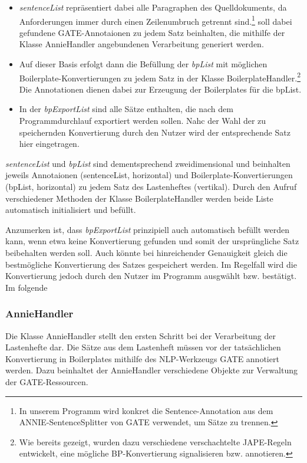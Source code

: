 \documentclass[12pt]{report}
\begin{document}
\begin{itemize}
\item \textit{sentenceList} repräsentiert dabei alle Paragraphen des Quelldokuments, da Anforderungen immer durch einen Zeilenumbruch getrennt sind.\footnote{In unserem Programm wird konkret die Sentence-Annotation aus dem ANNIE-SentenceSplitter von GATE verwendet, um Sätze zu trennen.} soll dabei gefundene GATE-Annotaionen zu jedem Satz beinhalten, die mithilfe der Klasse AnnieHandler angebundenen Verarbeitung generiert werden.
\item Auf dieser Basis erfolgt dann die Befüllung der \textit{bpList} mit möglichen Boilerplate-Konvertierungen zu jedem Satz in der Klasse BoilerplateHandler.\footnote{Wie bereits gezeigt, wurden dazu verschiedene verschachtelte JAPE-Regeln entwickelt, eine mögliche BP-Konvertierung signalisieren bzw. annotieren.} Die Annotationen dienen dabei zur Erzeugung der Boilerplates für die bpList.
\item In der \textit{bpExportList} sind alle Sätze enthalten, die nach dem Programmdurchlauf exportiert werden sollen. Nahc der Wahl der zu speichernden Konvertierung durch den Nutzer wird der entsprechende Satz hier eingetragen.
\end{itemize}

\textit{sentenceList} und \textit{bpList} sind dementsprechend zweidimensional und beinhalten jeweils Annotaionen (sentenceList, horizontal) und Boilerplate-Konvertierungen (bpList, horizontal) zu jedem Satz des Lastenheftes (vertikal). 
Durch den Aufruf verschiedener Methoden der Klasse BoilerplateHandler werden beide Liste automatisch initialisiert und befüllt.

Anzumerken ist, dass \textit{bpExportList} prinzipiell auch automatisch befüllt werden kann, wenn etwa keine Konvertierung gefunden und somit der ursprüngliche Satz beibehalten werden soll. Auch könnte bei hinreichender Genauigkeit gleich die bestmögliche Konvertierung des Satzes gespeichert werden. Im Regelfall wird die Konvertierung jedoch durch den Nutzer im Programm ausgwählt bzw. bestätigt. 
Im folgende

\subsubsection{AnnieHandler}
Die Klasse AnnieHandler stellt den ersten Schritt bei der Verarbeitung der Lastenhefte dar. Die Sätze aus dem Lastenheft müssen vor der tatsächlichen Konvertierung in Boilerplates mithilfe des NLP-Werkzeugs GATE annotiert werden.
Dazu beinhaltet der AnnieHandler verschiedene Objekte zur Verwaltung der GATE-Ressourcen. 
\end{document}

